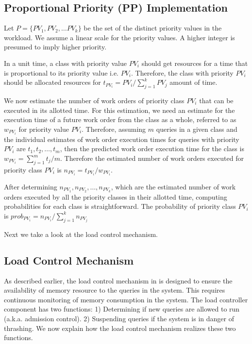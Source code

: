 \subsection{Proportional Priority (PP) Implementation}\label{ssec:proportional-priority}
Let $P = \{PV_{1}, PV_{2}, \ldots PV_{k}\}$ be the set of the distinct priority values 
in the workload. 
We assume a linear scale for the priority values. 
A higher integer is presumed to imply higher priority.

In a unit time, a class with priority value $PV_{i}$ should get resources for a time that is 
proportional to its priority value i.e. $PV_{i}$. 
Therefore, the class with priority $PV_{i}$ should be allocated resources for 
$t_{PV_{i}} = PV_{i}/\sum\limits_{j = 1}^{k}PV_{j}$ amount of time. 

We now estimate the number of work orders of priority class $PV_{i}$ that can be executed in its allotted time. 
For this estimation, we need an estimate for the execution time of a future work order from the class as a whole, referred to as $w_{PV_{i}}$ for priority value $PV_{i}$.
Therefore, assuming $m$ queries in a given class and the individual estimates of 
work order execution times for queries with priority $PV_{i}$ are $t_{1}, t_{2}, \ldots, t_{m}$, then the predicted work order execution time for the class is $w_{PV_{i}} = \sum\limits_{j = 1}^{m}t_{j}/m$.
Therefore the estimated number of work orders executed for priority class $PV_{i}$ is
$n_{PV_{i}} = t_{PV_{i}} / w_{PV_{i}}$.

After determining $n_{PV_{1}}, n_{PV_{2}}, \ldots, n_{PV_{k}}$, which are the 
estimated number of work orders executed by all the priority classes in their allotted
time, computing probabilities for each class is straightforward.
The probability of priority class $PV_{i}$ is 
$prob_{PV_{i}} = n_{PV_{i}}/\sum\limits_{j = 1}^{k}n_{PV_{j}}$

Next we take a look at the load control mechanism. %
\subsection{Load Control Mechanism}\label{ssec:load-control-mech}
As described earlier, the load control mechanism in \sys{} is designed to ensure the availability of memory resource to the queries in the system.
This requires continuous monitoring of memory consumption in the system.
The load controller component has two functions:
1) Determining if new queries are allowed to run (a.k.a. admission control).
2) Suspending queries if the system is in danger of thrashing.
We now explain how the load control mechanism realizes these two functions.

